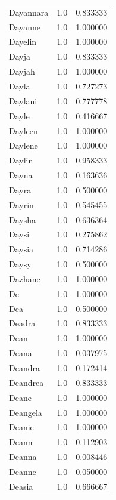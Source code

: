 \documentclass[
  letterpaper,
  DIV=11,
  numbers=noendperiod]{scrreprt}
\begin{document}
\begin{tabular}{lrr}
Dayannara       &   1.0 &   0.833333 \\
Dayanne         &   1.0 &   1.000000 \\
Dayelin         &   1.0 &   1.000000 \\
Dayja           &   1.0 &   0.833333 \\
Dayjah          &   1.0 &   1.000000 \\
Dayla           &   1.0 &   0.727273 \\
Daylani         &   1.0 &   0.777778 \\
Dayle           &   1.0 &   0.416667 \\
Dayleen         &   1.0 &   1.000000 \\
Daylene         &   1.0 &   1.000000 \\
Daylin          &   1.0 &   0.958333 \\
Dayna           &   1.0 &   0.163636 \\
Dayra           &   1.0 &   0.500000 \\
Dayrin          &   1.0 &   0.545455 \\
Daysha          &   1.0 &   0.636364 \\
Daysi           &   1.0 &   0.275862 \\
Daysia          &   1.0 &   0.714286 \\
Daysy           &   1.0 &   0.500000 \\
Dazhane         &   1.0 &   1.000000 \\
De              &   1.0 &   1.000000 \\
Dea             &   1.0 &   0.500000 \\
Deadra          &   1.0 &   0.833333 \\
Dean            &   1.0 &   1.000000 \\
Deana           &   1.0 &   0.037975 \\
Deandra         &   1.0 &   0.172414 \\
Deandrea        &   1.0 &   0.833333 \\
Deane           &   1.0 &   1.000000 \\
Deangela        &   1.0 &   1.000000 \\
Deanie          &   1.0 &   1.000000 \\
Deann           &   1.0 &   0.112903 \\
Deanna          &   1.0 &   0.008446 \\
Deanne          &   1.0 &   0.050000 \\
Deasia          &   1.0 &   0.666667 \\

\end{tabular}
\end{document}
